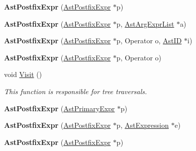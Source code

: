 \begin{DoxyCompactItemize}
\item 
\hypertarget{classAstPostfixExpr_af17b325f38a7138728773d86a9342105}{{\bfseries Ast\-Postfix\-Expr} (\hyperlink{classAstPostfixExpr}{Ast\-Postfix\-Expr} $\ast$p)}\label{classAstPostfixExpr_af17b325f38a7138728773d86a9342105}

\item 
\hypertarget{classAstPostfixExpr_a4a1ae7a03b7b29e6641f47479e58aa3b}{{\bfseries Ast\-Postfix\-Expr} (\hyperlink{classAstPostfixExpr}{Ast\-Postfix\-Expr} $\ast$p, \hyperlink{classAstArgExprList}{Ast\-Arg\-Expr\-List} $\ast$a)}\label{classAstPostfixExpr_a4a1ae7a03b7b29e6641f47479e58aa3b}

\item 
\hypertarget{classAstPostfixExpr_a094735e6e2f593a42cc2b9aabc44213b}{{\bfseries Ast\-Postfix\-Expr} (\hyperlink{classAstPostfixExpr}{Ast\-Postfix\-Expr} $\ast$p, Operator o, \hyperlink{classAstID}{Ast\-I\-D} $\ast$i)}\label{classAstPostfixExpr_a094735e6e2f593a42cc2b9aabc44213b}

\item 
\hypertarget{classAstPostfixExpr_a71f3baa5264259031d95741e65de1e07}{{\bfseries Ast\-Postfix\-Expr} (\hyperlink{classAstPostfixExpr}{Ast\-Postfix\-Expr} $\ast$p, Operator o)}\label{classAstPostfixExpr_a71f3baa5264259031d95741e65de1e07}

\item 
void \hyperlink{classAstPostfixExpr_ae3e7fdbd4c2bf888ee62760e6f422cad}{Visit} ()
\begin{DoxyCompactList}\small\item\em This function is responsible for tree traversals. \end{DoxyCompactList}\item 
\hypertarget{classAstPostfixExpr_a8299517f87239b0428545cdfc96f0bbc}{{\bfseries Ast\-Postfix\-Expr} (\hyperlink{classAstPrimaryExpr}{Ast\-Primary\-Expr} $\ast$p)}\label{classAstPostfixExpr_a8299517f87239b0428545cdfc96f0bbc}

\item 
\hypertarget{classAstPostfixExpr_a5dd762cbae8160f94a661ecdf3a90770}{{\bfseries Ast\-Postfix\-Expr} (\hyperlink{classAstPostfixExpr}{Ast\-Postfix\-Expr} $\ast$p, \hyperlink{classAstExpression}{Ast\-Expression} $\ast$e)}\label{classAstPostfixExpr_a5dd762cbae8160f94a661ecdf3a90770}

\item 
\hypertarget{classAstPostfixExpr_af17b325f38a7138728773d86a9342105}{{\bfseries Ast\-Postfix\-Expr} (\hyperlink{classAstPostfixExpr}{Ast\-Postfix\-Expr} $\ast$p)}\label{classAstPostfixExpr_af17b325f38a7138728773d86a9342105}


\end{DoxyCompactItemize}
